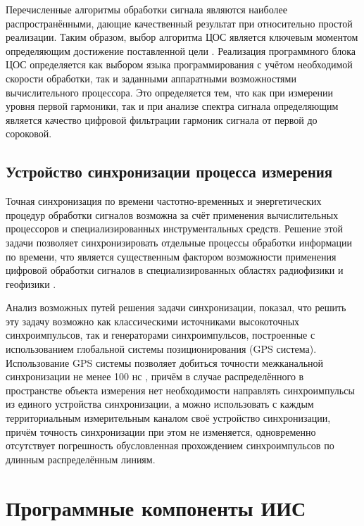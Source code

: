 \documentclass[a4paper, 14pt, titlepage]{extarticle}
\let\oldsection\section
\renewcommand{\section}{\newpage\oldsection}
\begin{document}
  Перечисленные алгоритмы обработки сигнала являются наиболее распространёнными, дающие качественный
  результат при относительно простой реализации. Таким образом, выбор алгоритма ЦОС является
  ключевым моментом определяющим достижение поставленной цели \cite{zubarev-realtime}. Реализация
  программного блока ЦОС определяется как выбором языка программирования с учётом необходимой
  скорости обработки, так и заданными аппаратными возможностями вычислительного процессора. Это
  определяется тем, что как при измерении уровня первой гармоники, так и при анализе спектра сигнала
  определяющим является качество цифровой фильтрации гармоник сигнала от первой до сороковой.

  \subsection{Устройство синхронизации процесса измерения}\label{ssec:sync}

  Точная синхронизация по времени частотно-временных и энергетических процедур обработки
  сигналов возможна за счёт применения вычислительных процессоров и специализированных
  инструментальных средств. Решение этой задачи позволяет синхронизировать отдельные процессы
  обработки информации по времени, что является существенным фактором возможности применения
  цифровой обработки сигналов в специализированных областях радиофизики и геофизики \cite{stupin-methods}.

  Анализ возможных путей решения задачи синхронизации, показал, что решить эту задачу возможно как
  классическими источниками высокоточных синхроимпульсов, так и генераторами синхроимпульсов,
  построенные с использованием глобальной системы позиционирования (GPS система). Использование GPS
  системы позволяет добиться точности межканальной синхронизации не менее 100 нс \cite{lombardi-gps}, причём в случае
  распределённого в пространстве объекта измерения нет необходимости направлять синхроимпульсы из
  единого устройства синхронизации, а можно использовать с каждым территориальным измерительным
  каналом своё устройство синхронизации, причём точность синхронизации при этом не изменяется,
  одновременно отсутствует погрешность обусловленная прохождением синхроимпульсов по длинным
  распределённым линиям.

  \section{Программные компоненты ИИС}
\end{document}
